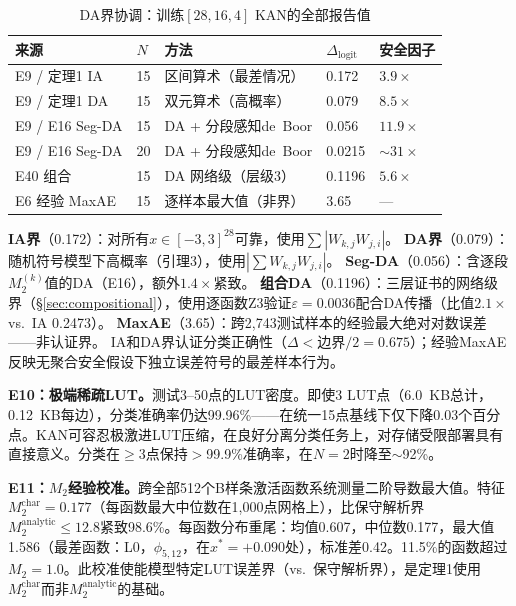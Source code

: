 \documentclass[journal,onecolumn]{IEEEtran}
\theoremstyle{definition}
\theoremstyle{plain}
\theoremstyle{remark}
\begin{document}
\begin{table}[!t]
\centering
\caption{DA界协调：训练$[28,16,4]$ KAN的全部报告值}
\label{tab:da_bounds_summary}
\footnotesize
\begin{tabular}{@{}lllll@{}}
\toprule
\textbf{来源} & \textbf{$N$} & \textbf{方法} & \textbf{$\Delta_{\text{logit}}$} & \textbf{安全因子} \\
\midrule
E9 / 定理1 IA  & 15 & 区间算术（最差情况） & 0.172 & $3.9\times$ \\
E9 / 定理1 DA  & 15 & 双元算术（高概率）     & 0.079 & $8.5\times$ \\
E9 / E16 Seg-DA & 15 & DA + 分段感知de~Boor  & 0.056 & $11.9\times$ \\
E9 / E16 Seg-DA & 20 & DA + 分段感知de~Boor  & 0.0215 & $\sim31\times$ \\
E40 组合         & 15 & DA 网络级（层级3）     & 0.1196 & $5.6\times$ \\
E6 经验 MaxAE   & 15 & 逐样本最大值（非界）   & 3.65   & --- \\
\bottomrule
\end{tabular}
\vspace{2pt}
{\scriptsize \textbf{IA界}（0.172）：对所有$x\in[-3,3]^{28}$可靠，使用$\sum|W_{k,j}W_{j,i}|$。
\textbf{DA界}（0.079）：随机符号模型下高概率（引理3），使用$|\sum W_{k,j}W_{j,i}|$。
\textbf{Seg-DA}（0.056）：含逐段$M_2^{(k)}$值的DA（E16），额外$1.4\times$紧致。
\textbf{组合DA}（0.1196）：三层证书的网络级界（{\S}\ref{sec:compositional}），使用逐函数Z3验证$\varepsilon=0.0036$配合DA传播（比值$2.1\times$ vs.\ IA 0.2473）。
\textbf{MaxAE}（3.65）：跨2,743测试样本的经验最大绝对对数误差——非认证界。
IA和DA界认证分类正确性（$\Delta < \text{边界}/2 = 0.675$）；经验MaxAE反映无聚合安全假设下独立误差符号的最差样本行为。}
\end{table}

\noindent\textbf{E10：极端稀疏LUT。}测试3--50点的LUT密度。即使3 LUT点（6.0~KB总计，0.12~KB每边），分类准确率仍达99.96\%——在统一15点基线下仅下降0.03个百分点。KAN可容忍极激进LUT压缩，在良好分离分类任务上，对存储受限部署具有直接意义。分类在$\geq$3点保持$>$99.9\%准确率，在$N=2$时降至$\sim$92\%。

\noindent\textbf{E11：$M_2$经验校准。}跨全部512个B样条激活函数系统测量二阶导数最大值。特征$M_2^{\text{char}}=0.177$（每函数最大中位数在1,000点网格上），比保守解析界$M_2^{\text{analytic}} \leq 12.8$紧致98.6\%。每函数分布重尾：均值0.607，中位数0.177，最大值1.586（最差函数：L0，$\phi_{5,12}$，在$x^* = +0.090$处），标准差0.42。11.5\%的函数超过$M_2 = 1.0$。此校准使能模型特定LUT误差界（vs.\ 保守解析界），是定理1使用$M_2^{\text{char}}$而非$M_2^{\text{analytic}}$的基础。
\end{document}
